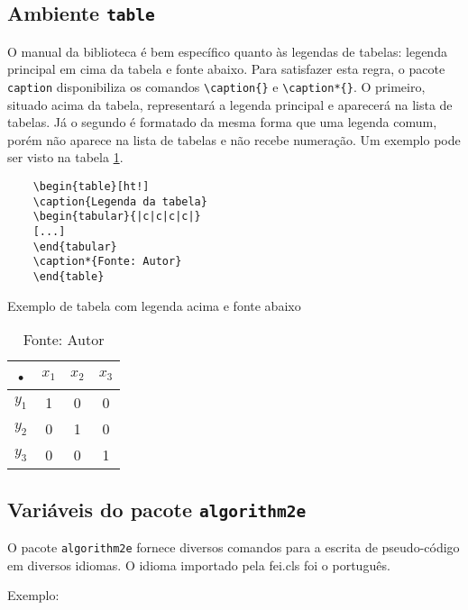 \documentclass{fei}
\begin{document}
    \subsection{Ambiente \texttt{table}}

	O manual da biblioteca é bem específico quanto às legendas de tabelas: legenda principal em cima da tabela e fonte abaixo. Para satisfazer esta regra, o pacote \texttt{caption} disponibiliza os comandos \verb+\caption{}+ e \verb+\caption*{}+. O primeiro, situado acima da tabela, representará a legenda principal e aparecerá na lista de tabelas. Já o segundo é formatado da mesma forma que uma legenda comum, porém não aparece na lista de tabelas e não recebe numeração. Um exemplo pode ser visto na tabela \ref{tbl:exemplo}.

\begin{verbatim}
	\begin{table}[ht!]
    \caption{Legenda da tabela}
    \begin{tabular}{|c|c|c|c|}
	[...]
    \end{tabular}
    \caption*{Fonte: Autor}
    \end{table}
\end{verbatim}

\begin{table}[ht!]
    \caption{Exemplo de tabela com legenda acima e fonte abaixo} \label{tbl:exemplo}
    \centering
    \begin{tabular}{|c|c|c|c|}
    \hline 
    • & \(x_1\) & \(x_2\) & \(x_3\) \\ 
    \hline 
    \(y_1\) & 1 & 0 & 0 \\ 
    \hline 
    \(y_2\) & 0 & 1 & 0 \\ 
    \hline 
    \(y_3\) & 0 & 0 & 1 \\ 
    \hline 
    \end{tabular}
    \caption*{Fonte: Autor}
\end{table}



    
    \subsection{Variáveis do pacote \texttt{algorithm2e}}
    
    O pacote \texttt{algorithm2e} fornece diversos comandos para a escrita de pseudo-código em diversos idiomas. O idioma importado pela fei.cls foi o português.
    
    Exemplo:
    
\end{document}
